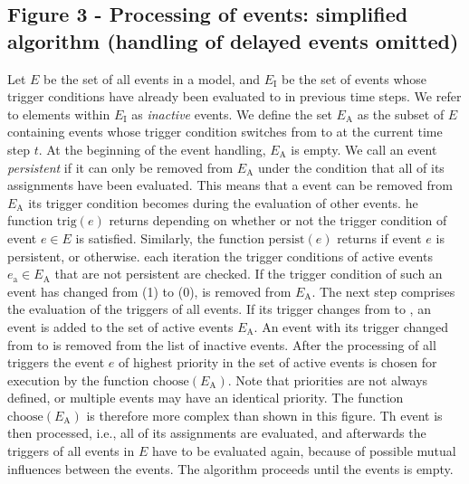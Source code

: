\documentclass[10pt]{bmc_article}
\newenvironment{bmcformat}{\begin{raggedright}\baselineskip20pt\sloppy\setboolean{publ}{false}}{\end{raggedright}\baselineskip20pt\sloppy}
\begin{document}
\begin{bmcformat}
\subsection*{Figure 3 - Processing of events: simplified algorithm (handling of delayed events omitted)}
Let $E$ be the set of all events in a model, and $E_\mathrm{I}$ be the set of events whose trigger conditions have already been evaluated to \true in previous time steps. 
We refer to elements within $E_\mathrm{I}$ as \emph{inactive} events.
We define the set $E_\mathrm{A}$ as the subset of $E$ containing events whose trigger condition switches from \false to \true at the current time step $t$.
At the beginning of the event handling, $E_\mathrm{A}$ is empty.
We call an event \emph{persistent}\COR{,} if it can only be removed from $E_\mathrm{A}$ under the condition that all of its assignments have been evaluated.
This means that a  event can be removed from $E_\mathrm{A}$  its trigger condition becomes \false during the evaluation of other events.
he function $\mathrm{trig}(e)$ returns  depending on whether or not the trigger condition of event $e \in E$ is satisfied.
Similarly, the function $\mathrm{persist}(e)$ returns  if event $e$ is persistent, or  otherwise.
 each iteration\COR{,} the trigger conditions of active events $e_\mathrm{a} \in E_\mathrm{A}$ that are not persistent are checked.
If the trigger condition of such an event has changed from \true (1) to \false (0),  is removed from $E_\mathrm{A}$.
The next step comprises the evaluation of the triggers of all events.
If its trigger changes from \false to \true, an event is added to the set of active events $E_\mathrm{A}$.
An event with its trigger changed from \true to \false is removed from the list of inactive events.
After the processing of all triggers\COR{,} the event $e$ of highest priority in the set of active events is chosen for execution by the function $\mathrm{choose}(E_\mathrm{A})$.
Note that priorities are not always defined, or multiple events may have an identical priority.
The function $\mathrm{choose}(E_\mathrm{A})$ is therefore more complex than shown in this figure.
Th event is then processed, i.e., all of its assignments are evaluated, and afterwards the triggers of all events in $E$ have to be evaluated again, because of possible mutual influences between the events.
The algorithm proceeds until the  events is empty.


\end{bmcformat}
\end{document}
